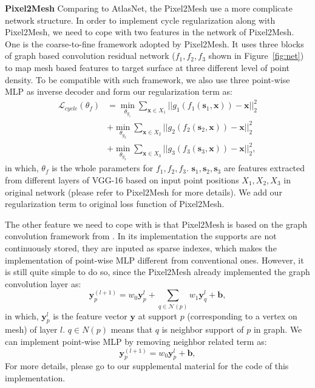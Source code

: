 \noindent\textbf{Pixel2Mesh}
Comparing to AtlasNet, the Pixel2Mesh\cite{pixel2mesh} use a more complicate network structure. In order to implement cycle regularization along with Pixel2Mesh, we need to cope with two features in the network of Pixel2Mesh. 
One is the coarse-to-fine framework adopted by Pixel2Mesh. It uses three blocks of graph based convolution residual network ($f_1,f_2,f_3$ shown in Figure~\ref{fig:net}) to map mesh based features to target surface at three different level of point density. To be compatible with such framework, we also use three point-wise MLP as inverse decoder and form our regularization term as:
\begin{equation}
\begin{aligned}
\mathcal{L}_{cycle}(\theta_f) &=  \min_{\theta_{g_1}}\sum_{\mathbf{x} \in X_1}||g_{1}(f_{1}(\mathbf{s}_1,\mathbf{x})) - \mathbf{x}||_2^2\\
&+ \min_{\theta_{g_2}}\sum_{\mathbf{x} \in X_2}||g_{2}(f_{2}(\mathbf{s}_2,\mathbf{x})) - \mathbf{x}||_2^2\\
&+ \min_{\theta_{g_3}}\sum_{\mathbf{x} \in X_3}||g_{3}(f_{3}(\mathbf{s}_3,\mathbf{x})) - \mathbf{x}||_2^2,
\end{aligned}
\end{equation}
in which, $\theta_f$ is the whole parameters for $f_1,f_2,f_3$. $\mathbf{s}_1,\mathbf{s}_2,\mathbf{s}_3$ are features extracted from different layers of VGG-16 based on input point positions $X_1,X_2,X_3$ in original network (please refer to Pixel2Mesh\cite{pixel2mesh} for more details). We add our regularization term to original loss function of Pixel2Mesh.

The other feature we need to cope with is that Pixel2Mesh is based on the graph convolution framework from \cite{graphconv}. In its implementation the supports are not continuously stored, they are inputed as sparse indexes, which makes the implementation of point-wise MLP different from conventional ones. However, it is still quite simple to do so, since the Pixel2Mesh already implemented the graph convolution layer as:
\begin{equation}
\mathbf{y}_p^{(l+1)} = w_0 \mathbf{y}_p^l + \sum_{q\in\mathcal{N}(p)} w_1\mathbf{y}_q^l + \mathbf{b},
\end{equation}
in which,  $\mathbf{y}_p^l$ is the feature vector $\mathbf{y}$ at support $p$ (corresponding to a vertex on mesh) of layer $l$. $q\in N(p)$ means that $q$ is neighbor support of $p$ in graph. We can implement point-wise MLP by removing neighbor related term as:
\begin{equation}
\mathbf{y}_p^{(l+1)} = w_0 \mathbf{y}_p^l + \mathbf{b},
\end{equation}
For more details, please go to our supplemental material for the code of this implementation.

